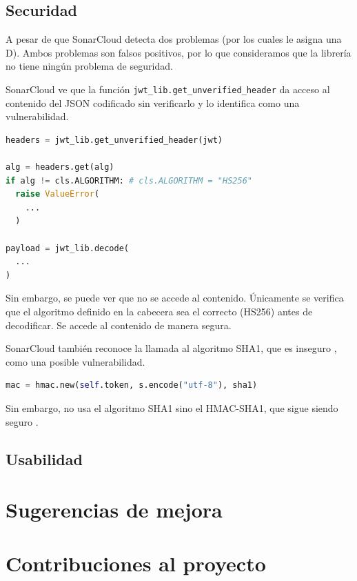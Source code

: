 \documentclass{article}
\begin{document}
\subsection{Securidad}

A pesar de que SonarCloud detecta dos problemas
(por los cuales le asigna una D).
Ambos problemas son falsos positivos, 
por lo que consideramos que la librería no tiene ningún problema de seguridad.

\hfill

SonarCloud ve que la función \verb|jwt_lib.get_unverified_header|
da acceso al contenido del JSON codificado sin verificarlo
y lo identifica como una vulnerabilidad.

\begin{lstlisting}[language=Python]
headers = jwt_lib.get_unverified_header(jwt)

alg = headers.get(alg)
if alg != cls.ALGORITHM: # cls.ALGORITHM = "HS256"
  raise ValueError(
    ...
  )

payload = jwt_lib.decode(
  ...
)
\end{lstlisting}

Sin embargo, se puede ver que no se accede al contenido.
Únicamente se verifica que el algoritmo definido en la cabecera
sea el correcto (HS256) antes de decodificar.
Se accede al contenido de manera segura.

\hfill

SonarCloud también reconoce la llamada al algoritmo SHA1,
que es inseguro \cite{sha1-broken},
como una posible vulnerabilidad.

\begin{lstlisting}[language=Python]
mac = hmac.new(self.token, s.encode("utf-8"), sha1)
\end{lstlisting}

Sin embargo, no usa el algoritmo SHA1
sino el HMAC-SHA1, que sigue siendo seguro \cite{hmac-sha1}.

\subsection{Usabilidad}

\section{Sugerencias de mejora}

\section{Contribuciones al proyecto}
\end{document}

